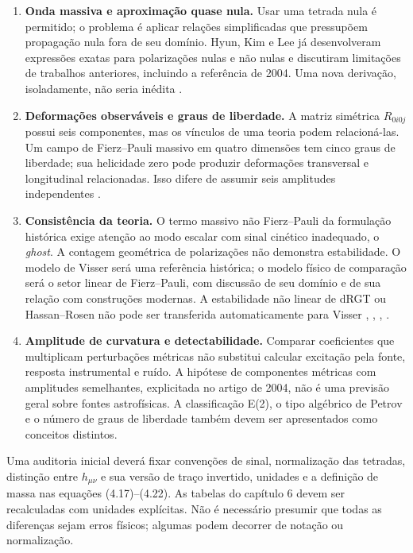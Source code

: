 \begin{enumerate}
\def\labelenumi{\arabic{enumi}.}
\tightlist
\item
  \textbf{Onda massiva e aproximação quase nula.} Usar uma tetrada nula
  é permitido; o problema é aplicar relações simplificadas que
  pressupõem propagação nula fora de seu domínio. Hyun, Kim e Lee já
  desenvolveram expressões exatas para polarizações nulas e não nulas e
  discutiram limitações de trabalhos anteriores, incluindo a referência
  de 2004. Uma nova derivação, isoladamente, não seria inédita \autocite{hyun2019}.
\item
  \textbf{Deformações observáveis e graus de liberdade.} A matriz
  simétrica \(R_{0i0j}\) possui seis componentes, mas os vínculos de uma
  teoria podem relacioná-las. Um campo de Fierz--Pauli massivo em quatro
  dimensões tem cinco graus de liberdade; sua helicidade zero pode
  produzir deformações transversal e longitudinal relacionadas. Isso
  difere de assumir seis amplitudes independentes \autocite{liang2021}.
\item
  \textbf{Consistência da teoria.} O termo massivo não Fierz--Pauli da
  formulação histórica exige atenção ao modo escalar com sinal cinético
  inadequado, o \emph{ghost}. A contagem geométrica de polarizações não
  demonstra estabilidade. O modelo de Visser será uma referência
  histórica; o modelo físico de comparação será o setor linear de
  Fierz--Pauli, com discussão de seu domínio e de sua relação com
  construções modernas. A estabilidade não linear de dRGT ou
  Hassan--Rosen não pode ser transferida automaticamente para Visser \autocite{visser1998}, \autocite{park2010}, \autocite{derham2011},
  \autocite{hassan2012}.
\item
  \textbf{Amplitude de curvatura e detectabilidade.} Comparar
  coeficientes que multiplicam perturbações métricas não substitui
  calcular excitação pela fonte, resposta instrumental e ruído. A
  hipótese de componentes métricas com amplitudes semelhantes,
  explicitada no artigo de 2004, não é uma previsão geral sobre fontes
  astrofísicas. A classificação E(2), o tipo algébrico de Petrov e o
  número de graus de liberdade também devem ser apresentados como
  conceitos distintos.
\end{enumerate}

Uma auditoria inicial deverá fixar convenções de sinal, normalização das
tetradas, distinção entre \(h_{\mu\nu}\) e sua versão de traço
invertido, unidades e a definição de massa nas equações (4.17)--(4.22).
As tabelas do capítulo 6 devem ser recalculadas com unidades explícitas.
Não é necessário presumir que todas as diferenças sejam erros físicos;
algumas podem decorrer de notação ou normalização.
